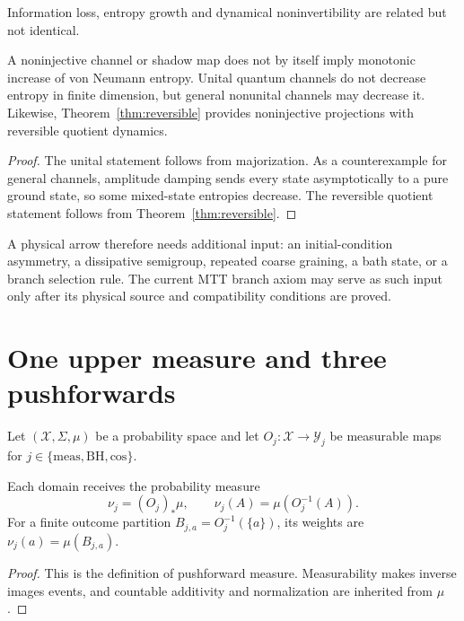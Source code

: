 \documentclass[11pt]{article}
\newcommand{\cX}{\mathcal X}
\newcommand{\cY}{\mathcal Y}
\begin{document}
Information loss, entropy growth and dynamical noninvertibility are related but not
identical.

\begin{proposition}\label{prop:entropy}
A noninjective channel or shadow map does not by itself imply monotonic increase of
von Neumann entropy. Unital quantum channels do not decrease entropy in finite
dimension, but general nonunital channels may decrease it. Likewise,
Theorem~\ref{thm:reversible} provides noninjective projections with reversible
quotient dynamics.
\end{proposition}

\begin{proof}
The unital statement follows from majorization. As a counterexample for general
channels, amplitude damping sends every state asymptotically to a pure ground state,
so some mixed-state entropies decrease. The reversible quotient statement follows
from Theorem~\ref{thm:reversible}.
\end{proof}

A physical arrow therefore needs additional input: an initial-condition asymmetry,
a dissipative semigroup, repeated coarse graining, a bath state, or a branch
selection rule. The current MTT branch axiom may serve as such input only after its
physical source and compatibility conditions are proved.

\section{One upper measure and three pushforwards}

Let $(\cX,\Sigma,\mu)$ be a probability space and let
$O_j:\cX\to\cY_j$ be measurable maps for
$j\in\{\mathrm{meas},\mathrm{BH},\mathrm{cos}\}$.

\begin{theorem}\label{thm:push}
Each domain receives the probability measure
\[
 \nu_j=(O_j)_*\mu,\qquad
 \nu_j(A)=\mu(O_j^{-1}(A)).
\]
For a finite outcome partition
$B_{j,a}=O_j^{-1}(\{a\})$, its weights are
$\nu_j(a)=\mu(B_{j,a})$.
\end{theorem}

\begin{proof}
This is the definition of pushforward measure. Measurability makes inverse images
events, and countable additivity and normalization are inherited from $\mu$.
\end{proof}
\end{document}
